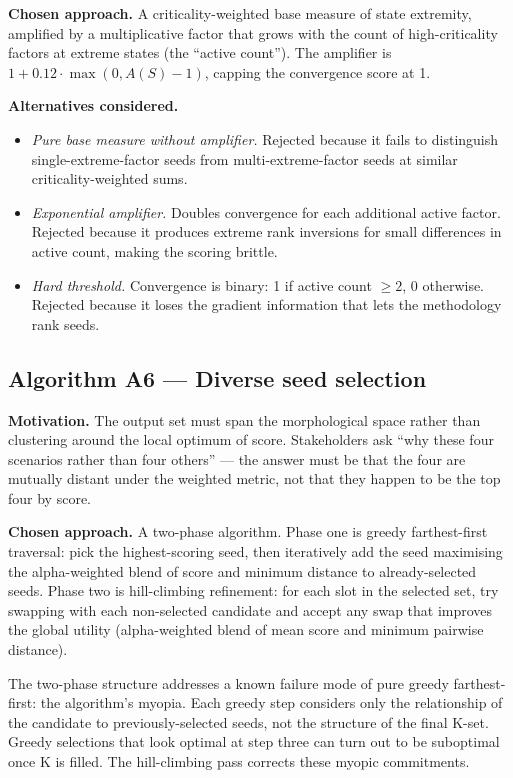 \documentclass[11pt,a4paper]{article}
\begin{document}
\textbf{Chosen approach.} A criticality-weighted base measure of state extremity, amplified by a multiplicative factor that grows with the count of high-criticality factors at extreme states (the ``active count''). The amplifier is $1 + 0.12 \cdot \max(0, A(S) - 1)$, capping the convergence score at 1.

\textbf{Alternatives considered.}

\begin{itemize}[leftmargin=*]
  \item \emph{Pure base measure without amplifier.} Rejected because it fails to distinguish single-extreme-factor seeds from multi-extreme-factor seeds at similar criticality-weighted sums.
  \item \emph{Exponential amplifier.} Doubles convergence for each additional active factor. Rejected because it produces extreme rank inversions for small differences in active count, making the scoring brittle.
  \item \emph{Hard threshold.} Convergence is binary: 1 if active count $\ge 2$, 0 otherwise. Rejected because it loses the gradient information that lets the methodology rank seeds.
\end{itemize}

\subsection{Algorithm A6 — Diverse seed selection}

\textbf{Motivation.} The output set must span the morphological space rather than clustering around the local optimum of score. Stakeholders ask ``why these four scenarios rather than four others'' — the answer must be that the four are mutually distant under the weighted metric, not that they happen to be the top four by score.

\textbf{Chosen approach.} A two-phase algorithm. Phase one is greedy farthest-first traversal: pick the highest-scoring seed, then iteratively add the seed maximising the alpha-weighted blend of score and minimum distance to already-selected seeds. Phase two is hill-climbing refinement: for each slot in the selected set, try swapping with each non-selected candidate and accept any swap that improves the global utility (alpha-weighted blend of mean score and minimum pairwise distance).

The two-phase structure addresses a known failure mode of pure greedy farthest-first: the algorithm's myopia. Each greedy step considers only the relationship of the candidate to previously-selected seeds, not the structure of the final K-set. Greedy selections that look optimal at step three can turn out to be suboptimal once K is filled. The hill-climbing pass corrects these myopic commitments.
\end{document}
